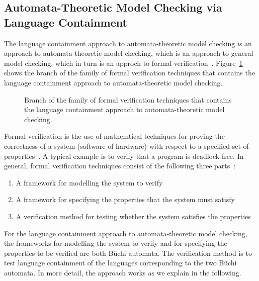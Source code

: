 

\subsection{Automata-Theoretic Model Checking via Language Containment}
The language containment approach to automata-theoretic model checking is an approach to automata-theoretic model checking, which is an approach to general model checking, which in turn is an approch to formal verification~\cite{2007_vardi_model_checking}. Figure~\ref{model_checking} shows the branch of the family of formal verification techniques that contains the language containment approach to automata-theoretic model checking.

\begin{figure}[htb]
\centering
\ModelChecking
\caption{Branch of the family of formal verification techniques that contains the language containment approach to automata-theoretic model checking.}
\label{model_checking}
\end{figure}

Formal verification is the use of mathemtical techniques for proving the correctness of a system (software of hardware) with respect to a specified set of properties~\cite{2007_vardi_model_checking}. A typical example is to verify that a program is deadlock-free. In general, formal verification techniques consist of the following three parts~\cite{huth2004logic}:

\begin{enumerate}
\item A framework for modelling the system to verify
\item A framework for specifying the properties that the system must satisfy
\item A verification method for testing whether the system satisfies the properties
\end{enumerate}

For the language containment approach to automata-theoretic model checking, the frameworks for modelling the system to verify and for specifying the properties to be verified are both Büchi automata. The verification method is to test language containment of the languages corresponding to the two Büchi automata. In more detail, the approach works as we explain in the following.

